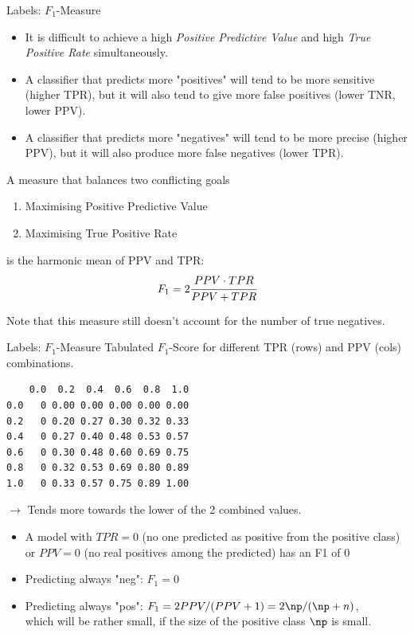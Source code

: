 \documentclass[11pt,compress,t,notes=noshow, xcolor=table]{beamer}
\makeatletter
\newenvironment{kframe}{%
 \def\at@end@of@kframe{}%
 \ifinner\ifhmode%
  \def\at@end@of@kframe{\end{minipage}}%
  \begin{minipage}{\columnwidth}%
 \fi\fi%
 \def\FrameCommand##1{\hskip\@totalleftmargin \hskip-\fboxsep
 \colorbox{shadecolor}{##1}\hskip-\fboxsep
     \hskip-\linewidth \hskip-\@totalleftmargin \hskip\columnwidth}%
 \MakeFramed {\advance\hsize-\width
   \@totalleftmargin\z@ \linewidth\hsize
   \@setminipage}}%
 {\par\unskip\endMakeFramed%
 \at@end@of@kframe}
\newenvironment{knitrout}{}{} %
\makeatother
\begin{document}
\begin{vbframe}{Labels: $F_1$-Measure}
\begin{small}
 \begin{itemize}
   \item It is difficult to achieve a high \textit{Positive Predictive Value} and high \textit{True Positive Rate} simultaneously.
   \item A classifier that predicts more "positives" will tend to be more sensitive (higher TPR), but it will also tend to give more false positives (lower TNR, lower PPV).
   \item A classifier that predicts more "negatives" will tend to be more precise (higher PPV), but it will also produce more false negatives (lower TPR).
 \end{itemize}


A measure that balances two conflicting goals\\[.5em]
\begin{enumerate}
 \item Maximising Positive Predictive Value
 \item Maximising True Positive Rate\\[.5em]
\end{enumerate}
is the harmonic mean of PPV and TPR:
$$F_1 = 2 \cfrac{PPV \cdot TPR}{PPV + TPR}$$

Note that this measure still doesn’t account for the number of true
negatives.
\end{small}
\end{vbframe}

\begin{vbframe}{Labels: $F_1$-Measure}
Tabulated $F_1$-Score for different TPR (rows) and PPV (cols) combinations. 
\begin{knitrout}\scriptsize
{}\color{fgcolor}\begin{kframe}
\begin{verbatim}
    0.0  0.2  0.4  0.6  0.8  1.0
0.0   0 0.00 0.00 0.00 0.00 0.00
0.2   0 0.20 0.27 0.30 0.32 0.33
0.4   0 0.27 0.40 0.48 0.53 0.57
0.6   0 0.30 0.48 0.60 0.69 0.75
0.8   0 0.32 0.53 0.69 0.80 0.89
1.0   0 0.33 0.57 0.75 0.89 1.00
\end{verbatim}
\end{kframe}
\end{knitrout}
$\rightarrow$ Tends more towards the lower of the 2 combined values.


\begin{itemize}
  \item A model with $TPR=0$ (no one predicted as positive from the positive class) or $PPV=0$ (no real positives among the predicted) has an F1 of 0
  \item Predicting always "neg": $F_1 = 0$
  \item Predicting always "pos": $F_1 = 2 PPV / (PPV + 1) = 2 \np / (\np + n)$,\\ 
  which will be rather small, if the size of the positive class $\np$ is small.
\end{itemize}


\end{vbframe}

\endlecture
\end{document}
